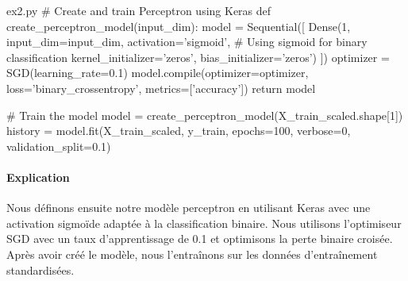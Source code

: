 \documentclass[12pt,a4paper]{article}
\begin{document}

\begin{codeholder}{ex2.py}
# Create and train Perceptron using Keras
def create_perceptron_model(input_dim):
    model = Sequential([
        Dense(1, input_dim=input_dim, activation='sigmoid',  # Using sigmoid for binary classification
              kernel_initializer='zeros', bias_initializer='zeros')
    ])
    optimizer = SGD(learning_rate=0.1)
    model.compile(optimizer=optimizer, loss='binary_crossentropy', metrics=['accuracy'])
    return model

# Train the model
model = create_perceptron_model(X_train_scaled.shape[1])
history = model.fit(X_train_scaled, y_train, 
                    epochs=100, 
                    verbose=0,
                    validation_split=0.1)
\end{codeholder}

\paragraph{Explication}
Nous définons ensuite notre modèle perceptron en utilisant Keras avec une activation sigmoïde adaptée à la classification binaire.
Nous utilisons l'optimiseur SGD avec un taux d'apprentissage de 0.1 et optimisons la perte binaire croisée.
Après avoir créé le modèle, nous l'entraînons sur les données d'entraînement standardisées.


\end{document}
